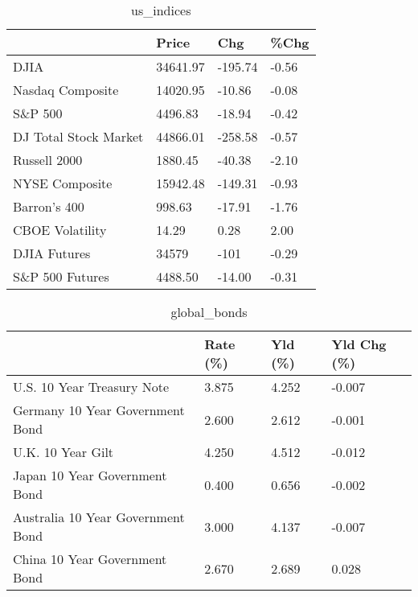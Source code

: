 \documentclass{article}%
\begin{document}
%


\begin{table}[htbp]%
\caption{us\_indices}%
\centering%
\begin{adjustbox}{width=1\textwidth}%
\begin{tabular}{llll}
\toprule
                      &    Price &     Chg &  \%Chg \\
\midrule
                 DJIA & 34641.97 & -195.74 & -0.56 \\
     Nasdaq Composite & 14020.95 &  -10.86 & -0.08 \\
              S\&P 500 &  4496.83 &  -18.94 & -0.42 \\
DJ Total Stock Market & 44866.01 & -258.58 & -0.57 \\
         Russell 2000 &  1880.45 &  -40.38 & -2.10 \\
       NYSE Composite & 15942.48 & -149.31 & -0.93 \\
         Barron's 400 &   998.63 &  -17.91 & -1.76 \\
      CBOE Volatility &    14.29 &    0.28 &  2.00 \\
         DJIA Futures &    34579 &    -101 & -0.29 \\
      S\&P 500 Futures &  4488.50 &  -14.00 & -0.31 \\
\bottomrule
\end{tabular}
%
\end{adjustbox}%
\end{table}

%


\begin{table}[htbp]%
\caption{global\_bonds}%
\centering%
\begin{adjustbox}{width=1\textwidth}%
\begin{tabular}{llll}
\toprule
                                  & Rate (\%) & Yld (\%) & Yld Chg (\%) \\
\midrule
       U.S. 10 Year Treasury Note &    3.875 &   4.252 &      -0.007 \\
  Germany 10 Year Government Bond &    2.600 &   2.612 &      -0.001 \\
                U.K. 10 Year Gilt &    4.250 &   4.512 &      -0.012 \\
    Japan 10 Year Government Bond &    0.400 &   0.656 &      -0.002 \\
Australia 10 Year Government Bond &    3.000 &   4.137 &      -0.007 \\
    China 10 Year Government Bond &    2.670 &   2.689 &       0.028 \\
\bottomrule
\end{tabular}
%
\end{adjustbox}%
\end{table}
\end{document}
